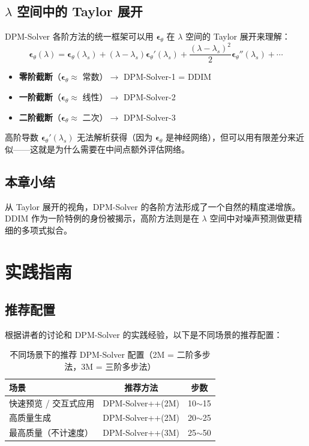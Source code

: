 \documentclass[a4paper]{article}
\begin{document}
\subsection{$\lambda$ 空间中的 Taylor 展开}

DPM-Solver 各阶方法的统一框架可以用 $\boldsymbol{\epsilon}_\theta$ 在 $\lambda$ 空间的 Taylor 展开来理解：
$$\boldsymbol{\epsilon}_\theta(\lambda) = \boldsymbol{\epsilon}_\theta(\lambda_s) + (\lambda - \lambda_s) \boldsymbol{\epsilon}_\theta'(\lambda_s) + \frac{(\lambda - \lambda_s)^2}{2} \boldsymbol{\epsilon}_\theta''(\lambda_s) + \cdots$$

\begin{itemize}
    \item \textbf{零阶截断}（$\boldsymbol{\epsilon}_\theta \approx$ 常数）$\to$ DPM-Solver-1 = DDIM
    \item \textbf{一阶截断}（$\boldsymbol{\epsilon}_\theta \approx$ 线性）$\to$ DPM-Solver-2
    \item \textbf{二阶截断}（$\boldsymbol{\epsilon}_\theta \approx$ 二次）$\to$ DPM-Solver-3
\end{itemize}

高阶导数 $\boldsymbol{\epsilon}_\theta'(\lambda_s)$ 无法解析获得（因为 $\boldsymbol{\epsilon}_\theta$ 是神经网络），但可以用有限差分来近似——这就是为什么需要在中间点额外评估网络。

\subsection{本章小结}

从 Taylor 展开的视角，DPM-Solver 的各阶方法形成了一个自然的精度递增族。DDIM 作为一阶特例的身份被揭示，高阶方法则是在 $\lambda$ 空间中对噪声预测做更精细的多项式拟合。


\section{实践指南}

\subsection{推荐配置}

根据讲者的讨论和 DPM-Solver 的实践经验，以下是不同场景的推荐配置：

\begin{table}[H]
\centering
\begin{tabular}{lcc}
\toprule
\textbf{场景} & \textbf{推荐方法} & \textbf{步数} \\
\midrule
快速预览 / 交互式应用 & DPM-Solver++(2M) & 10$\sim$15 \\
高质量生成 & DPM-Solver++(2M) & 20$\sim$25 \\
最高质量（不计速度） & DPM-Solver++(3M) & 25$\sim$50 \\
\bottomrule
\end{tabular}
\caption{不同场景下的推荐 DPM-Solver 配置（2M = 二阶多步法，3M = 三阶多步法）}
\end{table}
\end{document}

